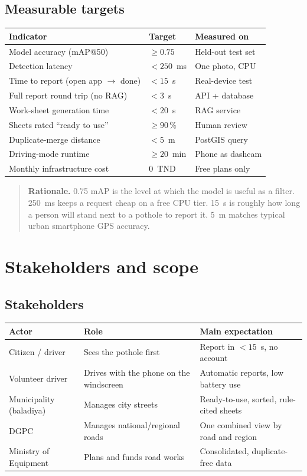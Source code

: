 \documentclass[11pt,a4paper,oneside]{report}
\newcommand{\why}[1]{\begin{quote}\small\textbf{Rationale.} #1\end{quote}}
\begin{document}
\section{Measurable targets}
\begin{longtable}{@{}L{6.2cm}L{3cm}L{5cm}@{}}
\toprule\textbf{Indicator} & \textbf{Target} & \textbf{Measured on}\\\midrule\endhead
Model accuracy (mAP@50) & $\geq 0.75$ & Held-out test set\\
Detection latency & $<250$~ms & One photo, CPU\\
Time to report (open app $\rightarrow$ done) & $<15$~s & Real-device test\\
Full report round trip (no RAG) & $<3$~s & API + database\\
Work-sheet generation time & $<20$~s & RAG service\\
Sheets rated ``ready to use'' & $\geq 90\,\%$ & Human review\\
Duplicate-merge distance & $<5$~m & PostGIS query\\
Driving-mode runtime & $\geq 20$~min & Phone as dashcam\\
Monthly infrastructure cost & 0~TND & Free plans only\\\bottomrule
\end{longtable}
\why{0.75 mAP is the level at which the model is useful as a filter. 250~ms keeps a request cheap on a free CPU
tier. 15~s is roughly how long a person will stand next to a pothole to report it. 5~m matches typical urban
smartphone GPS accuracy.}

\chapter{Stakeholders and scope}
\section{Stakeholders}
\begin{longtable}{@{}L{3.6cm}L{4.6cm}L{5.6cm}@{}}
\toprule\textbf{Actor} & \textbf{Role} & \textbf{Main expectation}\\\midrule\endhead
Citizen / driver & Sees the pothole first & Report in $<15$~s, no account\\
Volunteer driver & Drives with the phone on the windscreen & Automatic reports, low battery use\\
Municipality (baladiya) & Manages city streets & Ready-to-use, sorted, rule-cited sheets\\
DGPC & Manages national/regional roads & One combined view by road and region\\
Ministry of Equipment & Plans and funds road works & Consolidated, duplicate-free data\\\bottomrule
\end{longtable}
\end{document}

